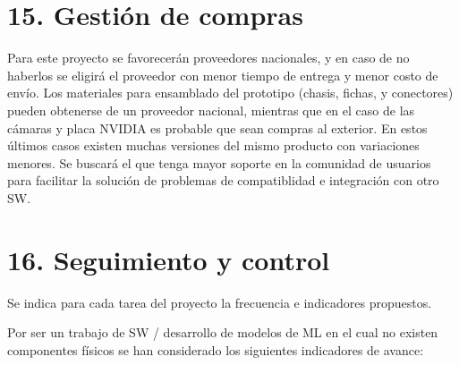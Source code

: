 \documentclass[11pt]{charter}
\begin{document}
\section{15. Gestión de compras}
\label{sec:compras}

Para este proyecto se favorecerán proveedores nacionales, y en caso de no haberlos se eligirá el proveedor con menor tiempo de entrega y menor costo de envío.
Los materiales para ensamblado del prototipo (chasis, fichas, y conectores) pueden obtenerse de un proveedor nacional, mientras que en el caso de las cámaras y placa NVIDIA es probable que sean compras al exterior. En estos últimos casos existen muchas versiones del mismo producto con variaciones menores. Se buscará el que tenga mayor soporte en la comunidad de usuarios para facilitar la solución de problemas de compatiblidad e integración con otro SW.

\section{16. Seguimiento y control}
\label{sec:seguimiento}

Se indica para cada tarea del proyecto la frecuencia e indicadores propuestos.

Por ser un trabajo de SW / desarrollo de modelos de ML en el cual no existen componentes físicos se han considerado los siguientes indicadores de avance:
\end{document}
